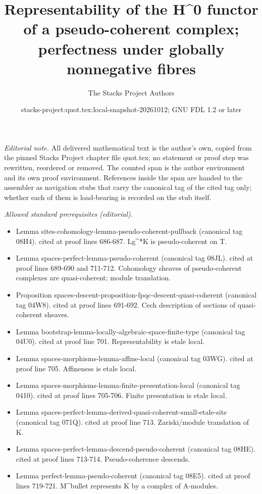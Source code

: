 \documentclass{stacks-project}
\title{Representability of the H\textasciicircum{}0 functor of a pseudo-coherent complex; perfectness under globally nonnegative fibres}
\author{The Stacks Project Authors}
\date{stacks-project:quot.tex:local-snapshot-20261012; GNU FDL 1.2 or later}
\theoremstyle{plain}
\theoremstyle{definition}
\theoremstyle{remark}
\numberwithin{equation}{subsection}
\begin{document}
\maketitle
\setcounter{subsection}{1}
\noindent\textit{Editorial note.} All delivered mathematical text is the author's own, copied from the pinned Stacks Project chapter file quot.tex; no statement or proof step was rewritten, reordered or removed. The counted span is the author environment and its own proof environment. References inside the span are handed to the assembler as navigation stubs that carry the canonical tag of the cited tag only; whether each of them is load-bearing is recorded on the stub itself.\par\medskip
\noindent\textit{Allowed standard prerequisites (editorial).}\begin{itemize}
\item Lemma sites-cohomology-lemma-pseudo-coherent-pullback (canonical tag 08H4). cited at proof lines 686-687. Lg\textasciicircum{}*K is pseudo-coherent on T.
\item Lemma spaces-perfect-lemma-pseudo-coherent (canonical tag 08JL). cited at proof lines 689-690 and 711-712. Cohomology sheaves of pseudo-coherent complexes are quasi-coherent; module translation.
\item Proposition spaces-descent-proposition-fpqc-descent-quasi-coherent (canonical tag 04W8). cited at proof lines 691-692. Cech description of sections of quasi-coherent sheaves.
\item Lemma bootstrap-lemma-locally-algebraic-space-finite-type (canonical tag 04U0). cited at proof line 701. Representability is etale local.
\item Lemma spaces-morphisms-lemma-affine-local (canonical tag 03WG). cited at proof line 705. Affineness is etale local.
\item Lemma spaces-morphisms-lemma-finite-presentation-local (canonical tag 0410). cited at proof lines 705-706. Finite presentation is etale local.
\item Lemma spaces-perfect-lemma-derived-quasi-coherent-small-etale-site (canonical tag 071Q). cited at proof line 713. Zariski/module translation of K.
\item Lemma spaces-perfect-lemma-descend-pseudo-coherent (canonical tag 08HE). cited at proof lines 713-714. Pseudo-coherence descends.
\item Lemma perfect-lemma-pseudo-coherent (canonical tag 08E5). cited at proof lines 719-721. M\textasciicircum{}bullet represents K by a complex of A-modules.

\end{itemize}
\end{document}
